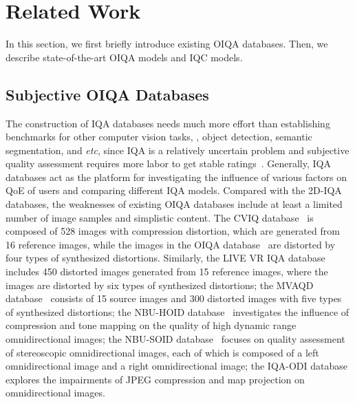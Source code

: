 \section{Related Work}
\label{sec:rw}

In this section, we first briefly introduce existing OIQA databases. Then, we describe state-of-the-art OIQA models and IQC models.


\subsection{Subjective OIQA Databases}
\label{subsec:database}

The construction of IQA databases needs much more effort than establishing benchmarks for other computer vision tasks, \eg, object detection, semantic segmentation, and \emph{etc}, since IQA is a relatively uncertain problem and subjective quality assessment requires more labor to get stable ratings~\cite{yan2022subjective,zhang2021uncertainty}. Generally, IQA databases act as the platform for investigating the influence of various factors on QoE of users and comparing different IQA models. Compared with the 2D-IQA databases, the weaknesses of existing OIQA databases include at least a limited number of image samples and simplistic content. The CVIQ database~\cite{sun2018large} is composed of 528 images with compression distortion, which are generated from 16 reference images, while the images in the OIQA database~\cite{duan2018perceptual} are distorted by four types of synthesized distortions. Similarly, the LIVE VR IQA database~\cite{chen2019study} includes 450 distorted images generated from 15 reference images, where the images are distorted by six types of synthesized distortions; the MVAQD database~\cite{jiang2021cubemap} consists of 15 source images and 300 distorted images with five types of synthesized distortions; the NBU-HOID database~\cite{cao2021quality} investigates the influence of compression and tone mapping on the quality of high dynamic range omnidirectional images; the NBU-SOID database~\cite{qi2020viewport} focuses on quality assessment of stereoscopic omnidirectional images, each of which is composed of a left omnidirectional image and a right omnidirectional image; the IQA-ODI database~\cite{yang2021spatial} explores the impairments of JPEG compression and map projection on omnidirectional images. 

